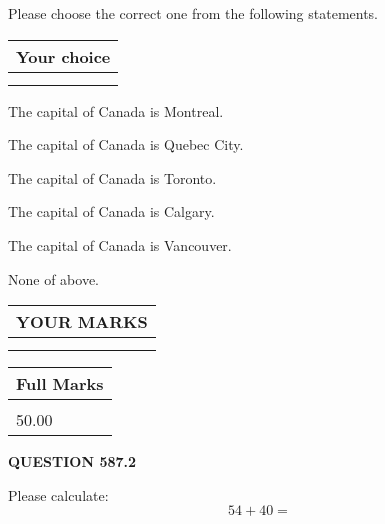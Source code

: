 \documentclass[12pt]{article}
\begin{document}
  
Please choose the correct one from the following statements.
  
  
\noindent\hspace{3.0in} \begin{tabular}{|l|}
\hline
Your choice \\
\hline
 \\ 
 \\ 
\hline
\end{tabular}
  
  
 
 
The capital of Canada is Montreal.
 
 
The capital of Canada is Quebec City.
 
 
The capital of Canada is Toronto.
 
 
The capital of Canada is Calgary.
 
 
The capital of Canada is Vancouver.
 
 
 None of above.
 
 
  
\vspace{0.2in}
  
\noindent\begin{tabular}{|l|}
\hline
 YOUR MARKS  \\
\hline
 \\ 
 \\ 
\hline
\end{tabular}
\hspace{0.05in} \begin{tabular}{|l|}
\hline
 Full Marks  \\
\hline
 \\ 
50.00 \\
\hline
\end{tabular}
{\textbf{\Large{QUESTION
587.2 
}}}
  
  
 
Please calculate:
\begin{equation}
54 +  %
40 = \nonumber
\end{equation}
 

 

 
   
   
 \vspace{0.2in}
 
   
   
   
   
\end{document}
